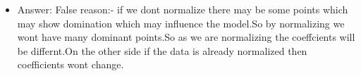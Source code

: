 \documentclass[11pt]{article}
\makeatletter
\providecommand{\tightlist}{%
      \setlength{\itemsep}{0pt}\setlength{\parskip}{0pt}}
\newcommand{\boxspacing}{\kern\kvtcb@left@rule\kern\kvtcb@boxsep}
\newcommand{\prompt}[4]{
        \ttfamily\llap{{\color{#2}[#3]:\hspace{3pt}#4}}\vspace{-\baselineskip}
    }
\makeatother
\begin{document}
\begin{itemize}
\tightlist
\item
  Answer: False reason:- if we dont normalize there may be some points
  which may show domination which may influence the model.So by
  normalizing we wont have many dominant points.So as we are normalizing
  the coeffcients will be differnt.On the other side if the data is
  already normalized then coefficients wont change.
\end{itemize}

    \begin{tcolorbox}[breakable, size=fbox, boxrule=1pt, pad at break*=1mm,colback=cellbackground, colframe=cellborder]
\prompt{In}{incolor}{ }{\boxspacing}
\begin{Verbatim}[commandchars=\\\{\}]

\end{Verbatim}
\end{tcolorbox}


    
    
    
\end{document}

